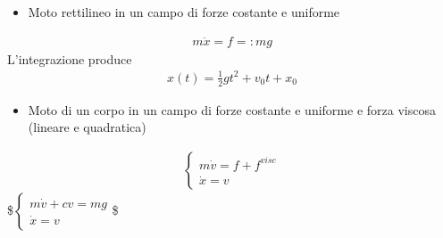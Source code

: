 \documentclass[letterpaper,10pt,english]{jupyterBook}
\begin{document}
\sphinxAtStartPar
{}
\begin{itemize}
\item {} 
\sphinxAtStartPar
Moto rettilineo in un campo di forze costante e uniforme

\end{itemize}
\begin{equation*}
\begin{split}m \ddot{x} = f =: m g\end{split}
\end{equation*}
\sphinxAtStartPar
L’integrazione produce
\begin{equation*}
\begin{split}x(t) = \frac{1}{2} g t^2 + v_0 t + x_0\end{split}
\end{equation*}\begin{itemize}
\item {} 
\sphinxAtStartPar
Moto di un corpo in un campo di forze costante e uniforme e forza viscosa (lineare e quadratica)

\end{itemize}
\begin{equation*}
\begin{split}\begin{cases}
m \dot{v} = f + f^{visc} \\
\dot{x} = v
\end{cases}\end{split}
\end{equation*}
\sphinxAtStartPar
{}
\$\(\begin{cases}
m \dot{v} + c v = mg \\
\dot{x} = v
\end{cases}\)\$
\end{document}
